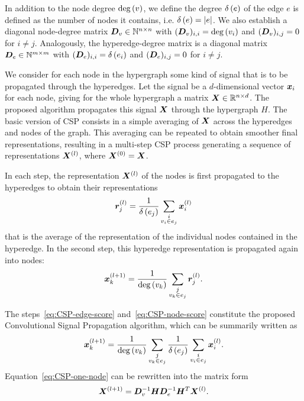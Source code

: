 In addition to the node degree \( \mathrm{deg} \left( v \right) \), we define the degree \( \delta \left( e \right) \) of the edge \( e \) is defined as the number of nodes it contains, i.e. \( \delta \left( e \right) = \left\lvert e \right\rvert \). We also establish a diagonal node-degree matrix \( \bm{D}_v \in \mathbb{N}^{n \times n} \) with \( (\bm{D}_v)_{i,i} = \mathrm{deg} \left( v_i \right) \) and \( (\bm{D}_v)_{i,j} = 0 \) for \( i \neq j \). Analogously, the hyperedge-degree matrix is a diagonal matrix \( \bm{D}_e \in \mathbb{N}^{m \times m} \) with \( (\bm{D}_e)_{i,i} = \delta \left( e_i \right) \) and \( (\bm{D}_e)_{i,j} = 0 \) for \( i \neq j \).

We consider for each node in the hypergraph some kind of signal that is to be propagated through the hyperedges. Let the signal be a \( d \)-dimensional vector \( \bm{x}_i \) for each node, giving for the whole hypergraph a matrix \( \bm{X} \in \mathbb{R}^{n \times d} \). The proposed algorithm propagates this signal $\bm{X}$ through the hypergraph $H$. The basic version of CSP consists in a simple averaging of \( \bm{X} \) across the hyperedges and nodes of the graph. This averaging can be repeated to obtain smoother final representations, resulting in a multi-step CSP process generating a sequence of representations \( \bm{X}^{(l)} \), where \( \bm{X}^{(0)} = \bm{X} \).

In each step, the representation $\bm{X}^{(l)}$ of the nodes is first propagated to the hyperedges to obtain their representations 
\begin{equation}\label{eq:CSP-edge-score}
\bm{r}_j^{(l)}=\frac{1}{\delta \left( e_j \right)}\sum_{\substack{i \\ v_i\in e_j}} \bm{x}_i^{(l)} 
\end{equation}
that is the average of the representation of the individual nodes contained in the hyperedge. In the second step, this hyperedge representation is propagated again into nodes:
\begin{equation}\label{eq:CSP-node-score}
\bm{x}_k^{(l+1)}=\frac{1}{\mathrm{deg} \left( v_k \right)}\sum_{\substack{j \\ v_k \in e_j}} \bm{r}_j^{(l)}.
\end{equation}

The steps~\ref{eq:CSP-edge-score} and~\ref{eq:CSP-node-score} constitute the proposed Convolutional Signal Propagation algorithm, which can be summarily written as
\begin{equation}\label{eq:CSP-one-node}
    \bm{x}_k^{(l+1)} = \frac{1}{\mathrm{deg} \left( v_k \right)}\sum_{\substack{j \\ v_k \in e_j}} \frac{1}{\delta \left( e_j \right)}\sum_{\substack{i \\ v_i \in e_j}} \bm{x}_i^{(l)}.
\end{equation}
Equation~\ref{eq:CSP-one-node} can be rewritten into the matrix form
\begin{equation}
    \bm{X}^{(l+1)} = \bm{D}_v^{-1} \bm{H} \bm{D}_e^{-1} \bm{H}^T \bm{X}^{(l)}.
\end{equation}

